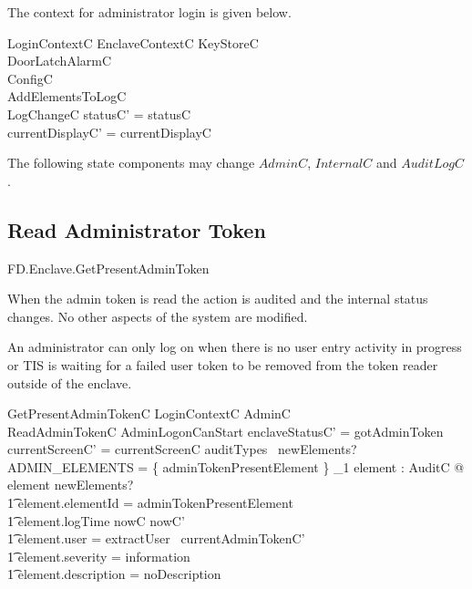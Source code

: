 The context for administrator login is given below.

\begin{schema}{LoginContextC}
        EnclaveContextC
\also
        \Xi KeyStoreC
\\      \Xi DoorLatchAlarmC
\\      \Xi ConfigC
\\      AddElementsToLogC
\\      LogChangeC
\where
        statusC' = statusC
\\      currentDisplayC' = currentDisplayC
\end{schema}

\begin{Zcomment}
\item
The following state components may change 
$AdminC$, $InternalC$ and  $AuditLogC$. 
\end{Zcomment}

\subsection{Read Administrator Token}

\begin{traceunit}{FD.Enclave.GetPresentAdminToken}
\end{traceunit}

When the admin token is read the action is audited and the internal
status changes. No other aspects of the system are modified.

An administrator can only log on when there is no user entry activity
in progress or TIS is waiting for a failed user token to be removed
from the token reader outside of the enclave.

\begin{schema}{GetPresentAdminTokenC}
         LoginContextC
\also
        \Xi AdminC
\\      ReadAdminTokenC
\where
        AdminLogonCanStart
\also
	enclaveStatusC' = gotAdminToken
\also
        currentScreenC' = currentScreenC
\also
        auditTypes~ newElements? \cap ADMIN\_ELEMENTS = 
        \{ adminTokenPresentElement \} 
\also
        \exists_1 element : AuditC @ element \in newElements? 
\\ \t1  \land element.elementId = adminTokenPresentElement
\\ \t1  \land element.logTime \in nowC \upto nowC'
\\ \t1  \land element.user = extractUser~ currentAdminTokenC'
\\ \t1  \land element.severity = information
\\ \t1  \land element.description = noDescription
\end{schema}

